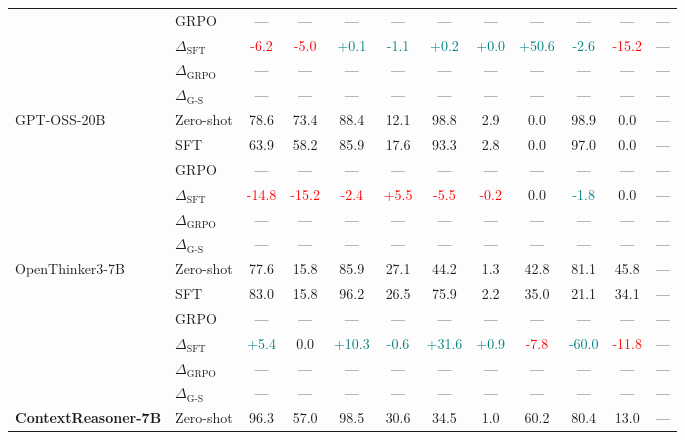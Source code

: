 \begin{table}[t]
\begin{tabular}{llcccccccccc}
 & GRPO & --- & --- & --- & --- & --- & --- & --- & --- & --- & --- \\
 & $\Delta_{\text{SFT}}$ & \textcolor{red}{-6.2} & \textcolor{red}{-5.0} & \textcolor{teal}{+0.1} & \textcolor{teal}{-1.1} & \textcolor{teal}{+0.2} & \textcolor{teal}{+0.0} & \textcolor{teal}{+50.6} & \textcolor{teal}{-2.6} & \textcolor{red}{-15.2} & --- \\
 & $\Delta_{\text{GRPO}}$ & --- & --- & --- & --- & --- & --- & --- & --- & --- & --- \\
 & $\Delta_{\text{G-S}}$ & --- & --- & --- & --- & --- & --- & --- & --- & --- & --- \\
\addlinespace
GPT-OSS-20B & Zero-shot & 78.6 & 73.4 & 88.4 & 12.1 & 98.8 & 2.9 & 0.0 & 98.9 & 0.0 & --- \\
 & SFT & 63.9 & 58.2 & 85.9 & 17.6 & 93.3 & 2.8 & 0.0 & 97.0 & 0.0 & --- \\
 & GRPO & --- & --- & --- & --- & --- & --- & --- & --- & --- & --- \\
 & $\Delta_{\text{SFT}}$ & \textcolor{red}{-14.8} & \textcolor{red}{-15.2} & \textcolor{red}{-2.4} & \textcolor{red}{+5.5} & \textcolor{red}{-5.5} & \textcolor{red}{-0.2} & 0.0 & \textcolor{teal}{-1.8} & 0.0 & --- \\
 & $\Delta_{\text{GRPO}}$ & --- & --- & --- & --- & --- & --- & --- & --- & --- & --- \\
 & $\Delta_{\text{G-S}}$ & --- & --- & --- & --- & --- & --- & --- & --- & --- & --- \\
\addlinespace
OpenThinker3-7B & Zero-shot & 77.6 & 15.8 & 85.9 & 27.1 & 44.2 & 1.3 & 42.8 & 81.1 & 45.8 & --- \\
 & SFT & 83.0 & 15.8 & 96.2 & 26.5 & 75.9 & 2.2 & 35.0 & 21.1 & 34.1 & --- \\
 & GRPO & --- & --- & --- & --- & --- & --- & --- & --- & --- & --- \\
 & $\Delta_{\text{SFT}}$ & \textcolor{teal}{+5.4} & 0.0 & \textcolor{teal}{+10.3} & \textcolor{teal}{-0.6} & \textcolor{teal}{+31.6} & \textcolor{teal}{+0.9} & \textcolor{red}{-7.8} & \textcolor{teal}{-60.0} & \textcolor{red}{-11.8} & --- \\
 & $\Delta_{\text{GRPO}}$ & --- & --- & --- & --- & --- & --- & --- & --- & --- & --- \\
 & $\Delta_{\text{G-S}}$ & --- & --- & --- & --- & --- & --- & --- & --- & --- & --- \\
\addlinespace
\textbf{ContextReasoner-7B} & Zero-shot & 96.3 & 57.0 & 98.5 & 30.6 & 34.5 & 1.0 & 60.2 & 80.4 & 13.0 & --- \\

\end{tabular}
\end{table}
